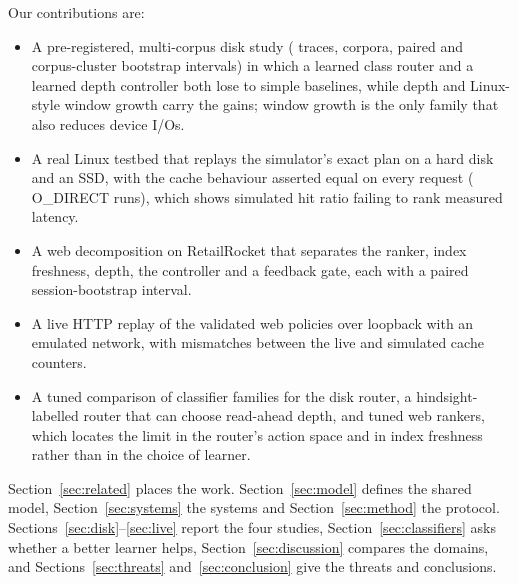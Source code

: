 Our contributions are:
\begin{itemize}
\item A pre-registered, multi-corpus disk study (\diskTraces{} traces,
  \diskCorpora{} corpora, paired and corpus-cluster bootstrap intervals) in which
  a learned class router and a learned depth controller both lose to simple
  baselines, while depth and Linux-style window growth carry the gains; window
  growth is the only family that also reduces device I/Os.
\item A real Linux testbed that replays the simulator's exact plan on a hard
  disk and an SSD, with the cache behaviour asserted equal on every request
  (\realioOdirectRuns{} O\_DIRECT runs), which shows simulated hit ratio failing
  to rank measured latency.
\item A web decomposition on RetailRocket that separates the ranker, index
  freshness, depth, the controller and a feedback gate, each with a paired
  session-bootstrap interval.
\item A live HTTP replay of the validated web policies over loopback with an
  emulated network, with \liveParityMismatches{} mismatches between the live
  and simulated cache counters.
\item A tuned comparison of \clfSynFamilies{} classifier families for the
  disk router, a hindsight-labelled router that can choose read-ahead depth,
  and tuned web rankers, which locates the limit in the router's action space
  and in index freshness rather than in the choice of learner.
\end{itemize}

Section~\ref{sec:related} places the work. Section~\ref{sec:model} defines the
shared model, Section~\ref{sec:systems} the systems and
Section~\ref{sec:method} the protocol. Sections~\ref{sec:disk}--\ref{sec:live}
report the four studies, Section~\ref{sec:classifiers} asks whether a better
learner helps, Section~\ref{sec:discussion} compares the domains,
and Sections~\ref{sec:threats} and~\ref{sec:conclusion} give the threats and
conclusions.
